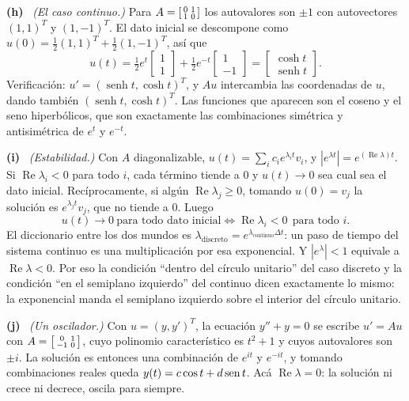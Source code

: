 \documentclass[11pt,a4paper]{article}
\newcommand{\bi}[1]{\boldsymbol{#1}}
\newcommand{\n}[1]{\boldsymbol{#1}}
\DeclareMathOperator{\gen}{span}
\DeclareMathOperator{\tr}{tr}
\DeclareMathOperator{\rg}{rg}
\DeclareMathOperator{\senh}{senh}
\DeclareMathOperator{\Real}{Re}
\def\n#1{#1}\def\bi#1{#1}\def\rg{rg}\def\tr{tr}\def\gen{span}%
\newcommand{\itemsol}[1]{\par\medskip\noindent\textbf{(#1)}\ \ignorespaces}
\begin{document}
\itemsol{h} \emph{(El caso continuo.)} Para
$A=\begin{bsmallmatrix}0&1\\1&0\end{bsmallmatrix}$ los autovalores son $\pm1$ con
autovectores $(1,1)^T$ y $(1,-1)^T$. El dato inicial se descompone como
$\n u(0)=\tfrac12(1,1)^T+\tfrac12(1,-1)^T$, así que
\[
\n u(t)=\tfrac12e^{t}\begin{bmatrix}1\\ 1\end{bmatrix}
       +\tfrac12e^{-t}\begin{bmatrix}1\\ -1\end{bmatrix}
=\begin{bmatrix}\cosh t\\ \senh t\end{bmatrix}.
\]
Verificación: $\n u'=(\senh t,\cosh t)^T$, y $A\n u$ intercambia las coordenadas
de $\n u$, dando también $(\senh t,\cosh t)^T$. Las funciones que aparecen son el
coseno y el seno hiperbólicos, que son exactamente las combinaciones simétrica y
antisimétrica de $e^t$ y $e^{-t}$.

\itemsol{i} \emph{(Estabilidad.)} Con $A$ diagonalizable,
$\n u(t)=\sum_ic_ie^{\lambda_it}\n v_i$, y
$|e^{\lambda t}|=e^{(\Real\lambda)t}$. Si $\Real\lambda_i<0$ para todo $i$, cada
término tiende a $0$ y $\n u(t)\to\n0$ sea cual sea el dato inicial.
Recíprocamente, si algún $\Real\lambda_j\ge0$, tomando $\n u(0)=\n v_j$ la
solución es $e^{\lambda_jt}\n v_j$, que no tiende a $\n0$. Luego
\[
\n u(t)\to\n0\ \text{para todo dato inicial}
\iff \Real\lambda_i<0\ \ \text{para todo } i .
\]
El diccionario entre los dos mundos es
$\lambda_{\text{discreto}}=e^{\lambda_{\text{continuo}}\Delta t}$: un paso de
tiempo del sistema continuo es una multiplicación por esa exponencial. Y
$|e^{\lambda}|<1$ equivale a $\Real\lambda<0$. Por eso la condición ``dentro del
círculo unitario'' del caso discreto y la condición ``en el semiplano
izquierdo'' del continuo dicen exactamente lo mismo: la exponencial manda el
semiplano izquierdo sobre el interior del círculo unitario.

\itemsol{j} \emph{(Un oscilador.)} Con $\n u=(y,y')^T$, la ecuación $y''+y=0$ se
escribe $\n u'=A\n u$ con $A=\begin{bsmallmatrix}0&1\\-1&0\end{bsmallmatrix}$,
cuyo polinomio característico es $t^2+1$ y cuyos autovalores son $\pm i$. La
solución es entonces una combinación de $e^{it}$ y $e^{-it}$, y tomando
combinaciones reales queda $y(t)=c\cos t+d\operatorname{sen} t$. Acá $\Real\lambda=0$: la
solución ni crece ni decrece, oscila para siempre.
\end{document}
